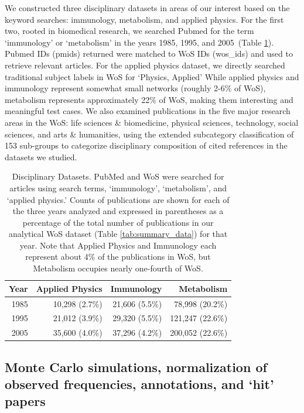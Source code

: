 \documentclass[NETN]{stjour}
\begin{document}
We constructed three disciplinary datasets in areas of our interest based on the keyword searches: immunology,   metabolism, and   applied physics. For the first two, rooted in biomedical research, we searched Pubmed for the term `immunology' or `metabolism' in the years 1985, 1995, and 2005~(Table \ref{tab:disc-datasets}). Pubmed IDs (pmids) returned were matched to WoS IDs (wos\_ids) and used to retrieve relevant articles. For the applied physics dataset, we directly searched traditional subject labels in WoS for `Physics, Applied' While applied physics and immunology represent somewhat small networks (roughly 2-6\% of WoS), metabolism represents approximately 22\% of WoS, making them interesting and meaningful test cases. We also examined publications in the five major research areas in the WoS: life sciences \& biomedicine, physical sciences, technology, social sciences, and arts \& humanities,  using the extended subcategory classification of 153 sub-groups to categorize disciplinary composition of cited references in the datasets we studied.
\vspace{-2 mm}
\begin{table}[ht]
\caption{Disciplinary Datasets. PubMed and WoS were searched for articles using search terms, `immunology', `metabolism', and `applied physics.' Counts of publications are shown for each of the three years analyzed and expressed in parentheses as a percentage of the total number of publications in our analytical WoS dataset (Table \ref{tab:summary_data}) for that year. Note that Applied Physics and Immunology each represent about 4\% of the publications in WoS, but Metabolism occupies nearly one-fourth of WoS.}
\label{tab:disc-datasets}
\centering
\begin{tabular}{|r r r r|}
  \hline
Year & Applied Physics & Immunology & Metabolism   \\ 
  \hline
1985 & 10,298 (2.7\%) & 21,606 (5.5\%) & 78,998 (20.2\%)  \\ 
1995 & 21,012 (3.9\%)  & 29,320 (5.5\%)  & 121,247 (22.6\%)   \\ 
2005 & 35,600 (4.0\%) & 37,296 (4.2\%) & 200,052 (22.6\%)    \\ 
 \hline
\end{tabular}
\vspace{-6mm}
\end{table}

\subsection{Monte Carlo simulations, normalization of observed frequencies, annotations, and `hit' papers}
\end{document}
